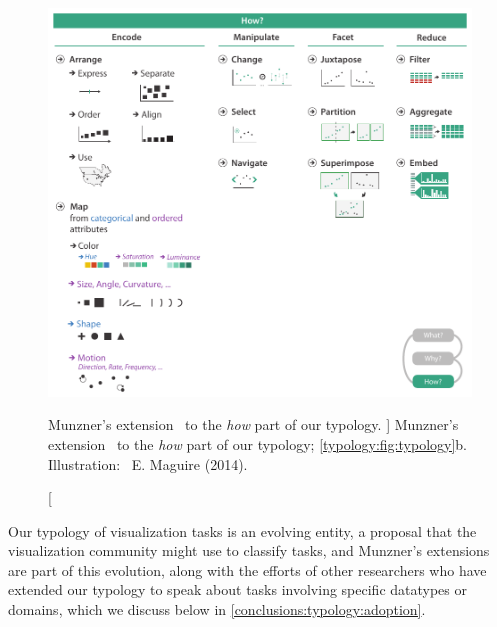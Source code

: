 
\begin{figure}
	\centering
    \includegraphics[width=\textwidth]{figures/fig3-7.pdf}
    \caption
    [
        Munzner's extension~\cite{Munzner2014} to the \textsl{how} part of our typology.
    ]
    {
        Munzner's extension~\cite{Munzner2014} to the \textsl{how} part of our typology; \cf \autoref{typology:fig:typology}b. Illustration: \ccLogo~E. Maguire (2014).
    }
	\centering
	\label{fig:typology-vad-how}
\end{figure}


Our typology of visualization tasks is an evolving entity, a proposal that the visualization community might use to classify tasks, and Munzner's extensions are part of this evolution, along with the efforts of other researchers who have extended our typology to speak about tasks involving specific datatypes or domains, which we discuss below in \autoref{conclusions:typology:adoption}.

